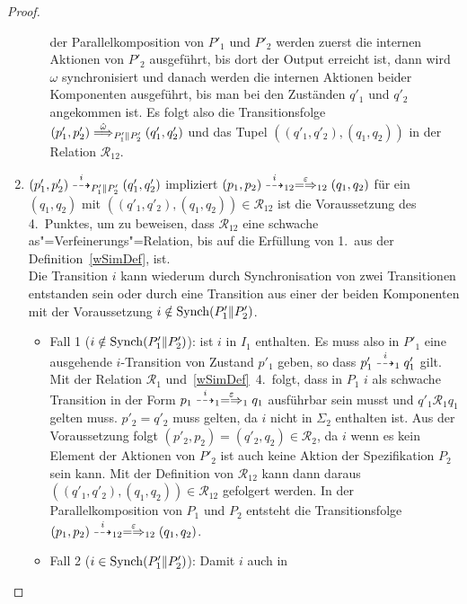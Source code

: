 \begin{proof}
\begin{enumerate}
\begin{itemize}
          der Parallelkomposition von $P'_1$ und $P'_2$ werden zuerst die
          internen Aktionen von $P'_2$ ausgeführt, bis dort der Output erreicht
          ist, dann wird $\omega$ synchronisiert und danach werden die internen
          Aktionen beider Komponenten ausgeführt, bis man bei den Zuständen
          $q'_1$ und $q'_2$ angekommen ist. Es folgt also die Transitionsfolge
          $(p'_1,p'_2) \weakmust[\hat{\omega}]_{P'_1\|P'_2} (q'_1,q'_2)$ und
          das Tupel $((q'_1,q'_2),(q_1,q_2))$ in der Relation
          $\mathcal{R}_{12}$.
      \end{itemize}
    \item $(p'_1,p'_2)\may[i]_{P'_1\|P'_2}(q'_1,q'_2)$ impliziert $(p_1,p_2)
      \may[i]_{12} \weakmay[\varepsilon]_{12} (q_1,q_2)$ für ein $(q_1,q_2)$
      mit $((q'_1,q'_2),(q_1,q_2))\in\mathcal{R}_{12}$ ist die Voraussetzung
      des 4.\ Punktes, um zu beweisen, dass $\mathcal{R}_{12}$ eine schwache
      as"=Verfeinerungs"=Relation, bis auf die Erfüllung von 1.\ aus der
      Definition~\ref{wSimDef}, ist.\\
      Die Transition $i$ kann wiederum durch Synchronisation von zwei
      Transitionen entstanden sein oder durch eine Transition aus einer der
      beiden Komponenten mit der Voraussetzung $i\notin\mathrm{Synch} (P'_1\|P'_2)$.
      \begin{itemize}
        \item Fall 1 ($i\notin\mathrm{Synch} (P'_1\|P'_2)$): \OBdA{} ist $i$ in $I_1$
          enthalten. Es muss also in $P'_1$ eine ausgehende $i$-Transition von
          Zustand $p'_1$ geben, so dass $p'_1\may[i]_1 q'_1$ gilt. Mit der
          Relation $\mathcal{R}_1$ und~\ref{wSimDef}~4.\ folgt, dass in $P_1$
          $i$ als schwache Transition in der Form $p_1\may[i]_1
          \weakmay[\varepsilon]_1 q_1$ ausführbar sein musst und $q'_1
          \mathcal{R}_1 q_1$ gelten muss. $p'_2=q'_2$ muss gelten, da $i$ nicht
          in $\Sigma _2$ enthalten ist. Aus der Voraussetzung folgt $(p'_2,p_2)
          =(q'_2,q_2) \in \mathcal{R}_2$, da $i$ wenn es kein Element der
          Aktionen von $P'_2$ ist auch keine Aktion der Spezifikation $P_2$
          sein kann. Mit der Definition von $\mathcal{R}_{12}$ kann dann daraus
          $((q'_1,q'_2),(q_1,q_2)) \in \mathcal{R}_{12}$ gefolgert werden. In
          der Parallelkomposition von $P_1$ und $P_2$ entsteht die
          Transitionsfolge $(p_1,p_2)\may[i]_{12} \weakmay[\varepsilon]_{12}
          (q_1,q_2)$.
        \item Fall 2 ($i\in\mathrm{Synch} (P'_1\|P'_2)$): Damit $i$ auch in

\end{itemize}
\end{enumerate}
\end{proof}
